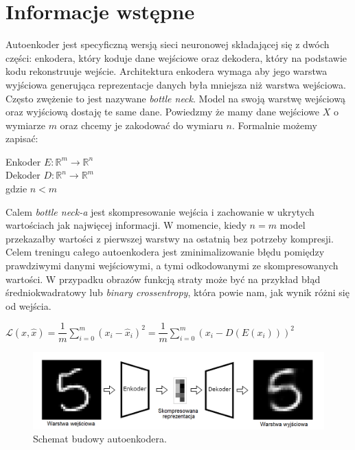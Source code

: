 \documentclass[a4paper,12pt]{book} %
\begin{document}
\section{Informacje wstępne}
Autoenkoder jest specyficzną wersją sieci neuronowej składającej się z dwóch części: enkodera, który koduje dane wejściowe oraz dekodera, który na podstawie kodu rekonstruuje wejście\cite{bank2021autoencoders}. Architektura enkodera wymaga aby jego warstwa wyjściowa generująca reprezentacje danych była mniejsza niż warstwa wejściowa. Często zwężenie to jest nazywane \textit{bottle neck}. Model na swoją warstwę wejściową oraz wyjściową dostaję te same dane. Powiedzmy że mamy dane wejściowe $X$ o wymiarze $m$ oraz chcemy je zakodować do wymiaru $n$. Formalnie możemy zapisać:\\
\begin{center}
	Enkoder $E : \mathbb{R}^m \rightarrow \mathbb{R}^n$\\
	Dekoder $D: \mathbb{R}^n \rightarrow \mathbb{R}^m$ \\
	gdzie $n < m$\\
\end{center}
Calem \textit{bottle neck-a} jest skompresowanie wejścia i zachowanie w ukrytych wartościach jak najwięcej informacji. W momencie, kiedy $n = m$ model przekazałby wartości z pierwszej warstwy na ostatnią bez potrzeby kompresji. Celem treningu całego autoenkodera jest zminimalizowanie błędu pomiędzy prawdziwymi danymi wejściowymi, a tymi odkodowanymi ze skompresowanych wartości. W przypadku obrazów funkcją straty może być na przykład błąd średniokwadratowy lub \textit{binary crossentropy}, która powie nam, jak wynik różni się od wejścia. 
 \begin{center}
 		$\mathcal{L}(x, \hat{x}) = \dfrac{1}{m}\displaystyle\sum_{i=0}^{m}(x_i-\hat{x}_i)^2 = \dfrac{1}{m}\displaystyle\sum_{i=0}^{m}(x_i-D(E(x_i)))^2$
 \end{center}

\begin{figure}[h]
	\centering\includegraphics[width=14.5cm]{pictures/autoencoder.png}
	\caption{Schemat budowy autoenkodera.}
\end{figure}
\newpage
\end{document}
